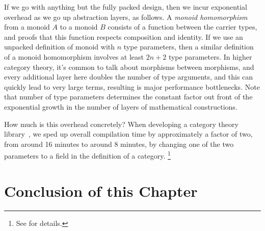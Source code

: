 If we go with anything but the fully packed design, then we incur exponential overhead as we go up abstraction layers, as follows.
A \emph{monoid homomorphism} from a monoid $A$ to a monoid $B$ consists of a function between the carrier types, and proofs that this function respects composition and identity.
If we use an unpacked definition of monoid with $n$ type parameters, then a similar definition of a monoid homomorphism involves at least $2n+2$ type parameters.
In higher category theory, it's common to talk about morphisms between morphisms, and every additional layer here doubles the number of type arguments, and this can quickly lead to very large terms, resulting is major performance bottlenecks.
Note that number of type parameters determines the constant factor out front of the exponential growth in the number of layers of mathematical constructions.

How much is this overhead concretely?
When developing a category theory library~\cite{category-coq-experience}, we sped up overall compilation time by approximately a factor of two, from around 16 minutes to around 8 minutes, by changing one of the two parameters to a field in the definition of a category.%
\footnote{%
  See  for details.%
}


\section{Conclusion of this Chapter}

